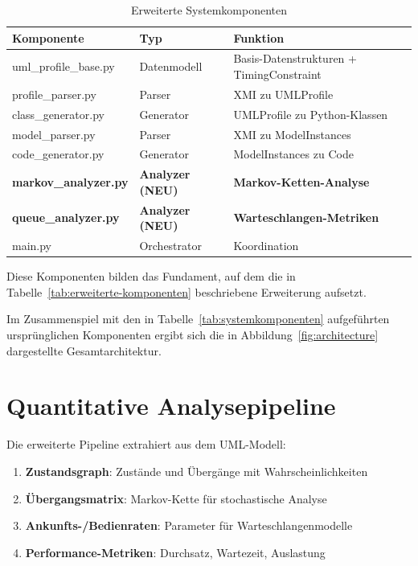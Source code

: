 ﻿\documentclass[a4paper,12pt]{report}
\theoremstyle{definition}
\begin{document}
\begin{table}[H]
	\centering
	\begin{tabular}{@{}llp{6cm}@{}}
		\toprule
		\textbf{Komponente} & \textbf{Typ} & \textbf{Funktion} \\
		\midrule
		uml\_profile\_base.py & Datenmodell & Basis-Datenstrukturen + TimingConstraint \\
		profile\_parser.py & Parser & XMI zu UMLProfile \\
		class\_generator.py & Generator & UMLProfile zu Python-Klassen \\
		model\_parser.py & Parser & XMI zu ModelInstances \\
		code\_generator.py & Generator & ModelInstances zu Code \\
		\textbf{markov\_analyzer.py} & \textbf{Analyzer (NEU)} & \textbf{Markov-Ketten-Analyse} \\
		\textbf{queue\_analyzer.py} & \textbf{Analyzer (NEU)} & \textbf{Warteschlangen-Metriken} \\
		main.py & Orchestrator & Koordination \\
		\bottomrule
	\end{tabular}
	\caption{Erweiterte Systemkomponenten}
\label{tab:erweiterte-komponenten}
	\label{tab:components-extended}
\end{table}

Diese Komponenten bilden das Fundament, auf dem die in Tabelle~\ref{tab:erweiterte-komponenten} beschriebene Erweiterung aufsetzt.

Im Zusammenspiel mit den in Tabelle~\ref{tab:systemkomponenten} aufgeführten ursprünglichen Komponenten ergibt sich die in Abbildung~\ref{fig:architecture} dargestellte Gesamtarchitektur.

\section{Quantitative Analysepipeline}

Die erweiterte Pipeline extrahiert aus dem UML-Modell:

\begin{enumerate}
	\item[-] \textbf{Zustandsgraph}: Zustände und Übergänge mit Wahrscheinlichkeiten
	\item[-] \textbf{Übergangsmatrix}: Markov-Kette für stochastische Analyse
	\item[-] \textbf{Ankunfts-/Bedienraten}: Parameter für Warteschlangenmodelle
	\item[-] \textbf{Performance-Metriken}: Durchsatz, Wartezeit, Auslastung
\end{enumerate}
\end{document}
